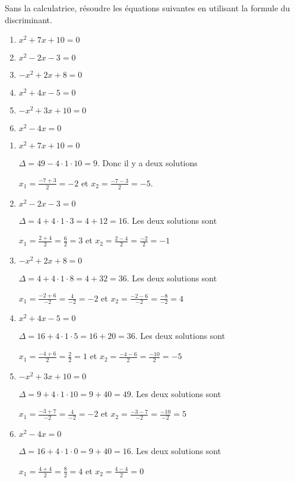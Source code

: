 \begin{exo}
Sans la calculatrice, résoudre les équations suivantes en utilisant la formule du discriminant.

\vspace{-2mm}

\begin{multicols}{2}
\begin{enumerate}[label=\bf{\alph*})\,]
\item $x^2+7x+10=0$
\item  $x^2-2x-3=0$
\item  $-x^2+2x+8=0$
\item  $x^2+4x-5=0$
\item  $-x^2+3x+10=0$
\item  $x^2-4x=0$
\end{enumerate}
\end{multicols}

\begin{sol*}
\begin{enumerate}[label=\bf{\alph*})\,]
	\item $x^2+7x+10=0$
	
	$\Delta = 49-4 \cdot 1 \cdot 10 = 9$. Donc il y a deux solutions \par $x_1=\frac{-7+3}{2}=-2$ et $x_2=\frac{-7-3}{2}=-5$. 
	
	\item  $x^2-2x-3=0$
	
	$\Delta = 4+4 \cdot 1 \cdot 3=4+12=16$. Les deux solutions sont \par $x_1 = \frac{2+4}{2} = \frac{6}{2} =3$ et $x_2 = \frac{2-4}{2} = \frac{-2}{2} =-1$
	
	\item  $-x^2+2x+8=0$
	
	$\Delta = 4+4 \cdot 1 \cdot 8=4+32=36$. Les deux solutions sont \par $x_1 = \frac{-2+6}{-2} = \frac{4}{-2} =-2$ et $x_2 = \frac{-2-6}{-2} = \frac{-8}{-2} =4 $	
	
	
	\item  $x^2+4x-5=0$
	
	$\Delta = 16+4 \cdot 1 \cdot 5=16+20=36$. Les deux solutions sont \par $x_1 = \frac{-4+6}{2} = \frac{2}{2} =1$ et $x_2 = \frac{-4-6}{2} = \frac{-10}{2} =-5 $	
	
	
	\item  $-x^2+3x+10=0$
	
	$\Delta = 9+4 \cdot 1 \cdot 10=9+40=49$. Les deux solutions sont \par $x_1 = \frac{-3+7}{-2} = \frac{4}{-2} =-2$ et $x_2 = \frac{-3-7}{-2} = \frac{-10}{-2} =5 $	
	
	
	\item  $x^2-4x=0$
	
	$\Delta = 16+4 \cdot 1 \cdot 0=9+40=16$. Les deux solutions sont \par $x_1 = \frac{4+4}{2} = \frac{8}{2} =4$ et $x_2 = \frac{4-4}{2} = 0 $	
	
	
\end{enumerate}	
\end{sol*}	


\end{exo}



